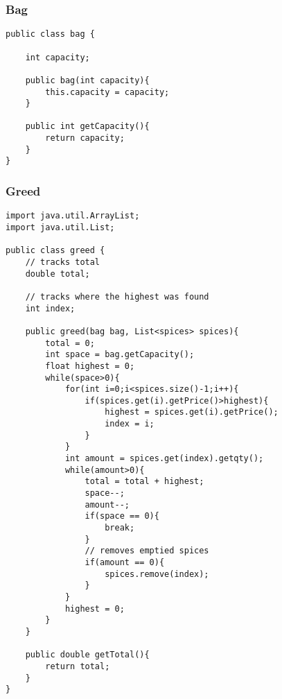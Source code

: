 \documentclass[10pt]{article}
\begin{document}
\subsubsection{Bag}
\lstset{numbers=left, numberstyle=\tiny, stepnumber=1, numbersep=5pt, basicstyle=\footnotesize\ttfamily}
\begin{lstlisting}[frame=single, ]  
public class bag {
    
    int capacity;

    public bag(int capacity){
        this.capacity = capacity;
    }

    public int getCapacity(){
        return capacity;
    }
}
\end{lstlisting}


\subsubsection{Greed}
\lstset{numbers=left, numberstyle=\tiny, stepnumber=1, numbersep=5pt, basicstyle=\footnotesize\ttfamily}
\begin{lstlisting}[frame=single, ]  
import java.util.ArrayList;
import java.util.List;

public class greed {
    // tracks total
    double total;

    // tracks where the highest was found
    int index;

    public greed(bag bag, List<spices> spices){
        total = 0;
        int space = bag.getCapacity();
        float highest = 0;
        while(space>0){
            for(int i=0;i<spices.size()-1;i++){
                if(spices.get(i).getPrice()>highest){
                    highest = spices.get(i).getPrice();
                    index = i;
                }
            }
            int amount = spices.get(index).getqty();
            while(amount>0){
                total = total + highest;
                space--;
                amount--;
                if(space == 0){
                    break;
                }
                // removes emptied spices
                if(amount == 0){
                    spices.remove(index);
                }
            }
            highest = 0;
        }
    }

    public double getTotal(){
        return total;
    }
}
\end{lstlisting}
\end{document}

